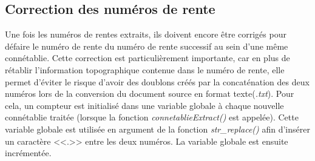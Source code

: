 \subsection{Correction des numéros de rente}
Une fois les numéros de rentes extraits, ils doivent encore être corrigés pour défaire le numéro de rente du numéro de rente successif au sein d'une même connétablie. Cette correction est particulièrement importante, car en plus de rétablir l'information topographique contenue dans le numéro de rente, elle permet d'éviter le risque d'avoir des doublons créés par la concaténation des deux numéros lors de la conversion du document source en format texte(\textit{.txt}).
Pour cela, un compteur est initialisé  dans une variable globale à chaque nouvelle connétablie traitée (lorsque la fonction \textit{connetablieExtract()} est appelée). 
Cette variable globale est utilisée en argument de la fonction \textit{str\_replace()} afin d'insérer un caractère <<.>> entre les deux numéros. La variable globale est ensuite incrémentée.

